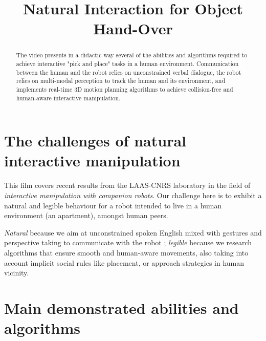 \documentclass[conference]{IEEEtran}
\begin{document}
%
\title{Natural Interaction for Object Hand-Over}


\author{
}
\maketitle


\begin{abstract}

The video presents in a didactic way several of the abilities and algorithms
required to achieve interactive "pick and place" tasks in a human environment.
Communication between the human and the robot relies on unconstrained verbal
dialogue, the robot relies on multi-modal perception to track the human and its
environment, and implements real-time 3D motion planning algorithms to achieve
collision-free and human-aware interactive manipulation.

\end{abstract}


\section{The challenges of natural interactive manipulation}

This film covers recent results from the LAAS-CNRS laboratory in the field of
\emph{interactive manipulation with companion robots}. Our challenge here is to
exhibit a natural and legible behaviour for a robot intended to live in a human
environment (an apartment), amongst human peers.

\emph{Natural} because we aim at unconstrained spoken English mixed with
gestures and perspective taking to communicate with the robot ; \emph{legible}
because we research algorithms that ensure smooth and human-aware movements,
also taking into account implicit social rules like placement, or approach
strategies in human vicinity.

\section{Main demonstrated abilities and algorithms}
\end{document}

